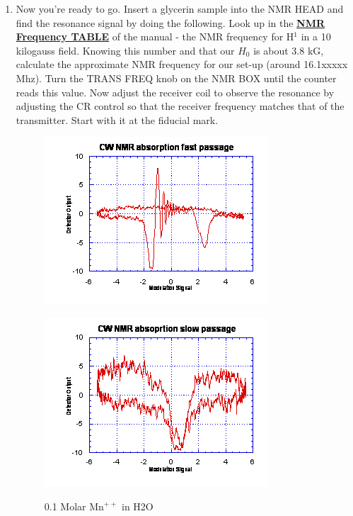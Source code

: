 \documentclass{../lab}
\begin{document}
\begin{enumerate}
    \item Now you're ready to go. Insert a glycerin sample into the NMR HEAD and find the resonance signal by doing the following. Look up in the \href{http://experimentationlab.berkeley.edu/sites/default/files/images/NMR32.jpg}{\textbf{NMR Frequency TABLE}} of the manual - the NMR frequency for H$^1$ in a 10 kilogauss field. Knowing this number and that our $H_0$ is about 3.8 kG, calculate the approximate NMR frequency for our set-up (around 16.1xxxxx Mhz). Turn the TRANS FREQ knob on the NMR BOX until the counter reads this value. Now adjust the receiver coil to observe the resonance by adjusting the CR control so that the receiver frequency matches that of the transmitter. Start with it at the fiducial mark.

    \begin{figure}[h]
    \begin{minipage}[t]{0.33\textwidth}
        \href{http://experimentationlab.berkeley.edu/sites/default/files/images/NMR21.gif}{\includegraphics[width=0.95\linewidth,keepaspectratio]{images/NMR21.png}}
        \caption{0.1 Molar Mn$^{++}$ in H2O}
        \label{fig:TenthMolarMn}
    \end{minipage}\hfill
    \begin{minipage}[t]{0.31\textwidth}
        \href{http://experimentationlab.berkeley.edu/sites/default/files/images/NMR22.gif}{\includegraphics[width=\linewidth,keepaspectratio]{images/NMR22.png}}

\end{minipage}
\end{figure}
\end{enumerate}
\end{document}
